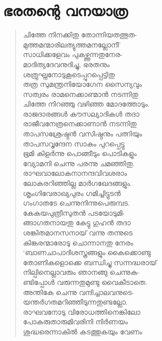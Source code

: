 
\section{ഭരതന്റെ വനയാത്ര}

\begin{verse}
ചിത്തേ നിനക്കിതു തോന്നിയതത്ഭുത-\\
മുത്തമന്മാരിലത്യുത്തമനല്ലോനീ’\\
സാധിക്കളേവം പുകഴ്ത്തുന്നതുനേര-\\
മാദിത്യദേവനുദിച്ചു, ഭരതനും\\
ശത്രുഘ്നനോടുകൂടെപ്പുറപ്പെട്ടിതു\\
തത്ര സുമന്ത്രനിയോഗേന സൈന്യവും\\
സത്വരം രാമനെക്കാണ്മാന്‍ നടന്നിതു\\
ചിത്തേ നിറഞ്ഞു വഴിഞ്ഞ മോദത്തോടും.\\
രാജദാരങ്ങള്‍ കൗസല്യാദികള്‍ തദാ\\
രാജീവനേത്രനെക്കാണാന്‍ നടന്നിതു\\
താപസശ്രേഷ്ഠന്‍ വസിഷ്ഠനും പത്നിയും\\
താപസവൃന്ദേന സാകം പുറപ്പെട്ടു\\
ഭൂമി കിളര്‍ന്നു പൊങ്ങീടും പൊടികളും\\
വ്യോമനി ചെന്നു പരന്നു ചമഞ്ഞിതു.\\
രാഘവാലോകനാനന്ദവിവശരാം\\
ലോകരറിഞ്ഞില്ല മാര്‍ഗഖേദങ്ങളും.\\
ശൃംഗിവേരാഖ്യപുരം ഗമിച്ചിട്ടുടന്‍\\
ഗംഗാതടേ ചെന്നുനിന്നുപെരുമ്പട.\\
കേകയപുത്രീസുതന്‍ പടയോടുമി-\\
ങ്ങാഗതനായതു കേട്ടു ഗുഹന്‍ തദാ\\
ശങ്കിതമാനസനായ് വന്നു തന്നുടെ\\
കിങ്കരന്മാരോടു ചൊന്നാനതു നേരം\\
‘ബാണചാപാദിശസ്ത്രങ്ങളും കൈക്കൊണ്ടു\\
തോണികളൊക്കെ ബന്ധിച്ചു സന്നദ്ധരായ്\\
നില്പിനെല്ലാവരും ഞാനങ്ങു ചെന്നുക-\\
ണ്ടിപ്പോള്‍ വരുന്നതുമുണ്ടു വൈകീടാതെ.\\
അന്തികേ ചെന്നു വന്ദിച്ചാലവനുടെ-\\
യന്തര്‍ഗതമറിഞ്ഞീടുന്നതുണ്ടല്ലോ.\\
രാഘവനോടു വിരോധത്തിനെങ്കിലോ\\
പോകരുതാരുമിവരിനി നിര്‍ണയം\\
ശുദ്ധരെന്നാകില്‍ കടത്തുകയും വേണം\\

\end{verse}
